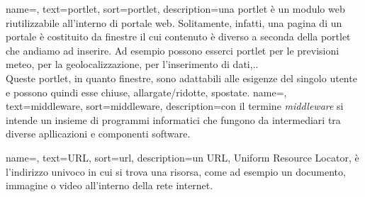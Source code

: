 {
	name=,
	text=portlet,
	sort=portlet,
	description={una portlet è un modulo web riutilizzabile all'interno di portale web. Solitamente, infatti, una pagina di un portale è costituito da finestre il cui contenuto è diverso a seconda della portlet che andiamo ad inserire. Ad esempio possono esserci portlet per le previsioni meteo, per la geolocalizzazione, per l'inserimento di dati,.. \\
	Queste portlet, in quanto finestre, sono adattabili alle esigenze del singolo utente e possono quindi esse chiuse, allargate/ridotte, spostate.}
}
{
	name=,
	text=middleware,
	sort=middleware,
	description={con il termine \emph{middleware} si intende un insieme di programmi informatici che fungono da intermediari tra diverse apllicazioni e componenti software.}
}

{name=,
text=URL,
sort=url,
description={un URL, Uniform Resource Locator, è l'indirizzo univoco in cui si trova una risorsa, come ad esempio un documento, immagine o video all'interno della rete internet.}
}